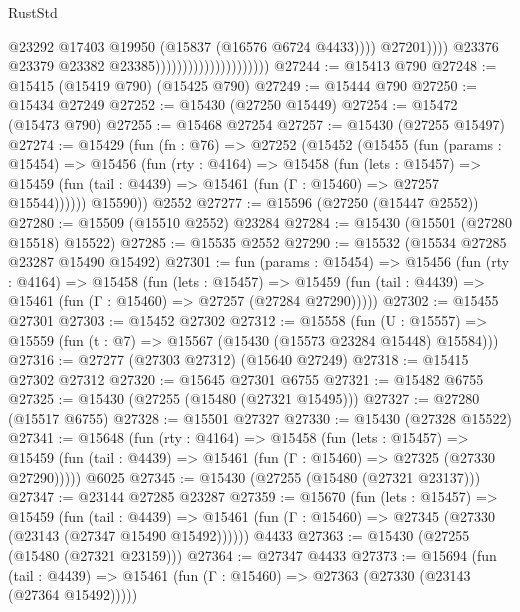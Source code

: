 \begin{lexlean}{RustStd}
\begin{coremodule}
                                                          @23292
                                                          @17403
                                                          @19950
                                                          (@15837 (@16576 @6724 @4433))))
                                                      @27201))))
                                              @23376
                                              @23379
                                              @23382
                                              @23385)))))))))))))))))))))
@27244 := @15413 @790
@27248 := @15415 (@15419 @790) (@15425 @790)
@27249 := @15444 @790
@27250 := @15434 @27249
@27252 := @15430 (@27250 @15449)
@27254 := @15472 (@15473 @790)
@27255 := @15468 @27254
@27257 := @15430 (@27255 @15497)
@27274 := @15429
    (fun (fn : @76) =>
    @27252
      (@15452
        (@15455
          (fun (params : @15454) =>
          @15456
            (fun (rty : @4164) =>
            @15458
              (fun (lets : @15457) =>
              @15459 (fun (tail : @4439) => @15461 (fun (Γ : @15460) => @27257 @15544))))))
        @15590))
    @2552
@27277 := @15596 (@27250 (@15447 @2552))
@27280 := @15509 (@15510 @2552) @23284
@27284 := @15430 (@15501 (@27280 @15518) @15522)
@27285 := @15535 @2552
@27290 := @15532 (@15534 @27285 @23287 @15490 @15492)
@27301 := fun (params : @15454) =>
  @15456
    (fun (rty : @4164) =>
    @15458
      (fun (lets : @15457) =>
      @15459 (fun (tail : @4439) => @15461 (fun (Γ : @15460) => @27257 (@27284 @27290)))))
@27302 := @15455 @27301
@27303 := @15452 @27302
@27312 := @15558
    (fun (U : @15557) => @15559 (fun (t : @7) => @15567 (@15430 (@15573 @23284 @15448) @15584)))
@27316 := @27277 (@27303 @27312) (@15640 @27249)
@27318 := @15415 @27302 @27312
@27320 := @15645 @27301 @6755
@27321 := @15482 @6755
@27325 := @15430 (@27255 (@15480 (@27321 @15495)))
@27327 := @27280 (@15517 @6755)
@27328 := @15501 @27327
@27330 := @15430 (@27328 @15522)
@27341 := @15648
    (fun (rty : @4164) =>
    @15458
      (fun (lets : @15457) =>
      @15459 (fun (tail : @4439) => @15461 (fun (Γ : @15460) => @27325 (@27330 @27290)))))
    @6025
@27345 := @15430 (@27255 (@15480 (@27321 @23137)))
@27347 := @23144 @27285 @23287
@27359 := @15670
    (fun (lets : @15457) =>
    @15459
      (fun (tail : @4439) =>
      @15461 (fun (Γ : @15460) => @27345 (@27330 (@23143 (@27347 @15490 @15492))))))
    @4433
@27363 := @15430 (@27255 (@15480 (@27321 @23159)))
@27364 := @27347 @4433
@27373 := @15694
    (fun (tail : @4439) => @15461 (fun (Γ : @15460) => @27363 (@27330 (@23143 (@27364 @15492)))))

\end{coremodule}
\end{lexlean}
